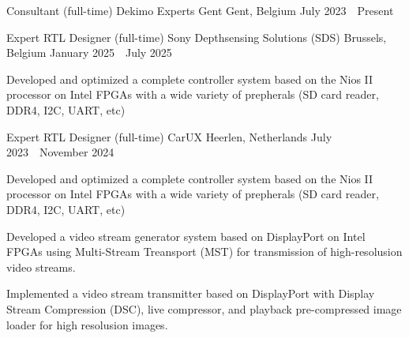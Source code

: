 


\begin{cventries}

  \cventry
  {Consultant (full-time)} %
  {Dekimo Experts Gent} %
  {Gent, Belgium} %
  {July 2023~\textendash~Present} %
  {}

  \cventry
  {Expert RTL Designer (full-time)} %
  {Sony Depthsensing Solutions (SDS)} %
  {Brussels, Belgium} %
  {January 2025~\textendash~July 2025} %
  {
    \begin{cvitems} %
      \item {Developed and optimized a complete controller system based on the Nios II processor on Intel FPGAs with a wide variety of prepherals (SD card reader, DDR4, I2C, UART, etc)}
    \end{cvitems}
  }

  \cventry
  {Expert RTL Designer (full-time)} %
  {CarUX} %
  {Heerlen, Netherlands } %
  {July 2023~\textendash~November 2024} %
  {
    \begin{cvitems} %
      \item {Developed and optimized a complete controller system based on the Nios II processor on Intel FPGAs with a wide variety of prepherals (SD card reader, DDR4, I2C, UART, etc)}
      \item {Developed a video stream generator system based on DisplayPort on Intel FPGAs using Multi-Stream Treansport (MST) for transmission of high-resolusion video streams.}
      \item {Implemented a video stream transmitter based on DisplayPort with Display Stream Compression (DSC), live compressor, and playback pre-compressed image loader for high resolusion images.}
    \end{cvitems}
  }


\end{cventries}
